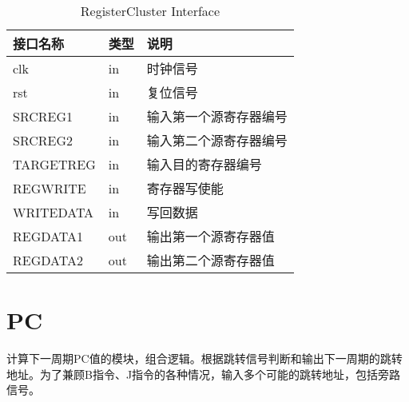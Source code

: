 \begin{center}
\renewcommand{\arraystretch}{1.3}
\small
\begin{longtable}{|p{3cm}<{\centering}|p{1.4cm}<{\centering}|p{7cm}<{\centering}|}
\caption{RegisterCluster Interface}
\label{tab:treatments}\\
\hline
接口名称 & 类型 & 说明 \\
\hline
clk & in & 时钟信号 \\
\hline
rst & in & 复位信号 \\
\hline
SRCREG1 & in & 输入第一个源寄存器编号 \\
\hline
SRCREG2 & in & 输入第二个源寄存器编号 \\
\hline
TARGETREG & in & 输入目的寄存器编号 \\
\hline
REGWRITE & in & 寄存器写使能 \\
\hline
WRITEDATA & in & 写回数据 \\
\hline
REGDATA1 & out & 输出第一个源寄存器值 \\
\hline
REGDATA2 & out &  输出第二个源寄存器值\\
\hline
\end{longtable}
\end{center}


\section{PC}

计算下一周期PC值的模块，组合逻辑。根据跳转信号判断和输出下一周期的跳转地址。为了兼顾B指令、J指令的各种情况，输入多个可能的跳转地址，包括旁路信号。

